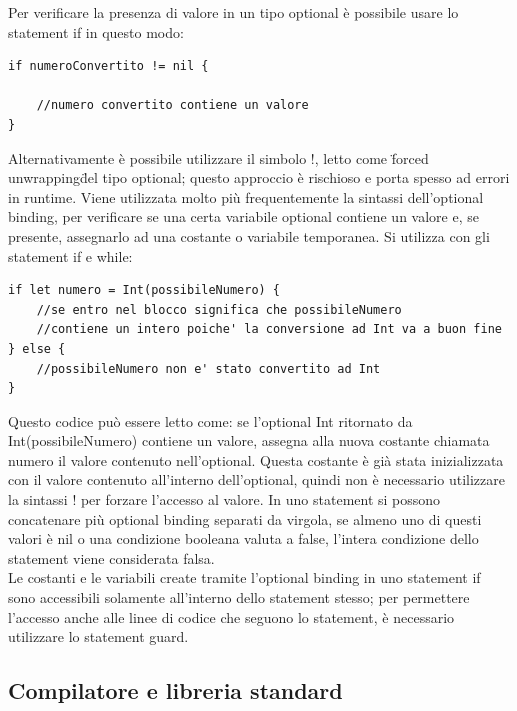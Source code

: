 Per verificare la presenza di valore in un tipo optional è possibile usare lo statement if in questo modo: 
\lstset{language=[Objective]C, breakindent=40pt, breaklines}
\begin{lstlisting}
if numeroConvertito != nil {

	//numero convertito contiene un valore
}
\end{lstlisting}
Alternativamente è possibile utilizzare il simbolo !, letto come \"forced unwrapping\"  del tipo optional; questo approccio è rischioso e porta spesso ad errori in runtime.
Viene utilizzata molto più frequentemente la sintassi dell'optional binding, per verificare se una certa variabile optional contiene un valore e, se presente, assegnarlo ad una costante o variabile temporanea. Si utilizza con gli statement if e while:
\begin{lstlisting}
if let numero = Int(possibileNumero) {
	//se entro nel blocco significa che possibileNumero 
	//contiene un intero poiche' la conversione ad Int va a buon fine
} else {
	//possibileNumero non e' stato convertito ad Int
}
\end{lstlisting}
Questo codice può essere letto come: se l'optional Int ritornato da Int(possibileNumero) contiene un valore, assegna alla nuova costante chiamata numero il valore contenuto nell'optional. Questa costante è già stata inizializzata con il valore contenuto all'interno dell'optional, quindi non è necessario utilizzare la sintassi ! per forzare l'accesso al valore. In uno statement si possono concatenare più optional binding separati da virgola, se almeno uno di questi valori è nil o una condizione booleana valuta a false, l'intera condizione dello statement viene considerata falsa.\\
Le costanti e le variabili create tramite l'optional binding in uno statement if sono accessibili solamente all'interno dello statement stesso; per permettere l'accesso anche alle linee di codice che seguono lo statement, è necessario utilizzare lo statement guard. 
\subsection{Compilatore e libreria standard}

